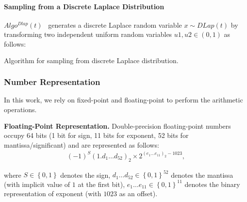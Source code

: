 \paragraph{Sampling from a Discrete Laplace Distribution}
$Algo^{Dlap}\left(t\right)$~\cite{eigner2014differentially} generates a discrete Laplace random variable $x\sim DLap\left(t\right) $ by transforming two independent uniform random variables $u1, u2 \in \left(0,1\right) $ as follows:

\begin{algorithm}[tbh!]
    \centering
    \caption{Algorithm for sampling from discrete Laplace distribution.}
    \label{algo:DiscreteLaplaceEigner}
\end{algorithm}
\FloatBarrier


\subsubsection{Number Representation}
\label{subsubsec:NumberRepresentation}
In this work, we rely on fixed-point and floating-point to perform the arithmetic operations.

\textbf{Floating-Point Representation.}
Double-precision floating-point numbers~\cite{IEEE754_2019} occupy 64 bits (1 bit for sign, 11 bits for exponent, 52 bits for mantissa/significant) and are represented as follows:
\begin{equation}
    \begin{split}
        \left(-1\right)^S\left(1.d_{1}\ldots d_{52}\right)_2\times 2^{\left(e_{1}\ldots e_{11}\right)_2 -1023} ,
    \end{split}
\end{equation}

where $S\in\left\{0,1\right\} $ denotes the sign, $d_{1}\ldots d_{52} \in \left\{0,1\right\}^{52} $ denotes the mantissa (with implicit value of $1$ at the first bit), $e_{1}\ldots e_{11} \in \left\{0,1\right\}^{11} $ denotes the binary representation of exponent (with $1023$ as an offset).


